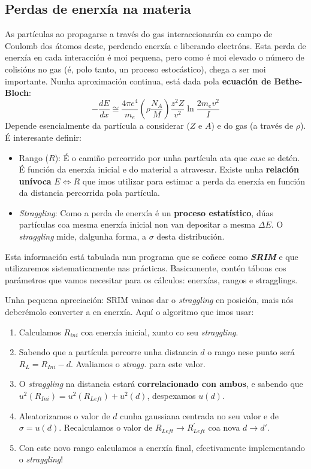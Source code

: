 \documentclass[11pt, a4paper]{article}
\begin{document}
\subsection{Perdas de enerxía na materia}
As partículas ao propagarse a través do gas interaccionarán co campo de Coulomb dos átomos deste, perdendo enerxía e liberando electróns. Esta perda de enerxía en cada interacción é moi pequena, pero como é moi elevado o número de colisións no gas (é, polo tanto, un proceso estocástico), chega a ser moi importante. Nunha aproximación continua, está dada pola \textbf{ecuación de Bethe-Bloch}:
\begin{equation*}\label{eq:stopping}
    - \frac{dE}{dx} \cong \frac{4 \pi e^4}{m_e} \left(\rho \frac{N_A}{M}\right)\frac{z^2 Z}{v^2} \ln{\frac{2m_e v^2}{I}}
\end{equation*}
Depende esencialmente da partícula a considerar ($Z$ e $A$) e do gas (a través de $\rho$). É interesante definir:
\begin{itemize}
    \item Rango ($R$): É o camiño percorrido por unha partícula ata que \textit{case} se detén. É función da enerxía inicial e do material a atravesar. Existe unha \textbf{relación unívoca} $E \Longleftrightarrow R$ que imos utilizar para estimar a perda da enerxía en función da distancia percorrida pola partícula.
    \item \textit{Straggling}: Como a perda de enerxía é un \textbf{proceso estatístico}, dúas partículas coa mesma enerxía inicial non van depositar a mesma $\Delta E$. O \textit{straggling} mide, dalgunha forma, a $\sigma$ desta distribución.
\end{itemize}
Esta información está tabulada nun programa que se coñece como \textit{\textbf{SRIM}} e que utilizaremos sistematicamente nas prácticas. Basicamente, contén táboas cos parámetros que vamos necesitar para os cálculos: enerxías, rangos e stragglings.

Unha pequena apreciación: SRIM vainos dar o \textit{straggling} en posición, mais nós deberémolo converter a en enerxía. Aquí o algoritmo que imos usar:
\begin{enumerate}
    \item Calculamos $R_{ini}$ coa enerxía inicial, xunto co seu \textit{straggling}.
    \item Sabendo que a partícula percorre unha distancia $d$ o rango nese punto será $R_{L} = R_{Ini} - d$. Avaliamos o \textit{stragg.} para este valor.
    \item O \textit{straggling} na distancia estará \textbf{correlacionado con ambos}, e sabendo que $u^2(R_{Ini}) = u^2(R_{Left}) + u^2(d)$, despexamos $u(d)$.
    \item Aleatorizamos o valor de $d$ cunha gaussiana centrada no seu valor e de $\sigma = u(d)$. Recalculamos o valor de $R_{Left} \longrightarrow R_{Left}^{\prime}$ coa nova $d \longrightarrow d\prime$.
    \item Con este novo rango calculamos a enerxía final, efectivamente implementando o \textit{straggling}!
\end{enumerate}
\end{document}
